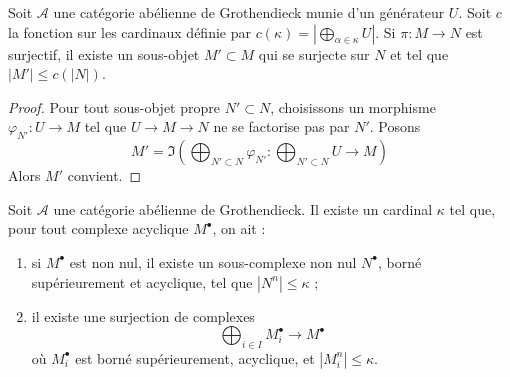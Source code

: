 \begin{lemma}
\label{lemma-surjection-bounded-size}
Soit $\mathcal{A}$ une catégorie abélienne de Grothendieck munie d'un
générateur $U$. Soit $c$ la fonction sur les cardinaux définie par
$c(\kappa) = |\bigoplus_{\alpha \in \kappa} U|$. Si $\pi : M \to N$ est
surjectif, il existe un sous-objet $M' \subset M$ qui se surjecte sur $N$
et tel que $|M'| \leq c(|N|)$.
\end{lemma}

\begin{proof}
Pour tout sous-objet propre $N' \subset N$, choisissons un morphisme
$\varphi_{N'} : U \to M$ tel que $U \to M \to N$ ne se factorise pas
par $N'$. Posons
$$
M' = \Im\left(
\bigoplus\nolimits_{N' \subset N} \varphi_{N'} :
\bigoplus\nolimits_{N' \subset N} U \longrightarrow M\right)
$$
Alors $M'$ convient.
\end{proof}

\begin{lemma}
\label{lemma-acyclic-quotient-complexes-bounded-size}
Soit $\mathcal{A}$ une catégorie abélienne de Grothendieck. Il existe un
cardinal $\kappa$ tel que, pour tout complexe acyclique $M^\bullet$, on ait :
\begin{enumerate}
\item si $M^\bullet$ est non nul, il existe un sous-complexe non nul
$N^\bullet$, borné supérieurement et acyclique, tel que
$|N^n| \leq \kappa$ ;
\item il existe une surjection de complexes
$$
\bigoplus\nolimits_{i \in I} M_i^\bullet \longrightarrow M^\bullet
$$
où $M_i^\bullet$ est borné supérieurement, acyclique, et
$|M_i^n| \leq \kappa$.
\end{enumerate}
\end{lemma}

